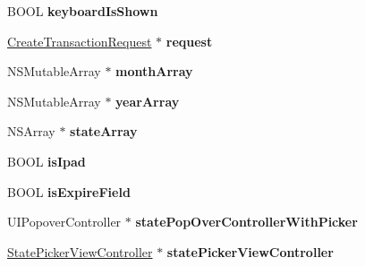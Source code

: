 \begin{DoxyCompactItemize}
\item 
\hypertarget{interface_purchase_view_controller_a2dc9c946b8b61a83de6a713363dc5a04}{
BOOL {\bfseries keyboardIsShown}}
\label{interface_purchase_view_controller_a2dc9c946b8b61a83de6a713363dc5a04}

\item 
\hypertarget{interface_purchase_view_controller_ade1e4f284142cd5479f7287fe9490ce2}{
\hyperlink{interface_create_transaction_request}{CreateTransactionRequest} $\ast$ {\bfseries request}}
\label{interface_purchase_view_controller_ade1e4f284142cd5479f7287fe9490ce2}

\item 
\hypertarget{interface_purchase_view_controller_a217ed433ae0f289fc0e23d0377adeed8}{
NSMutableArray $\ast$ {\bfseries monthArray}}
\label{interface_purchase_view_controller_a217ed433ae0f289fc0e23d0377adeed8}

\item 
\hypertarget{interface_purchase_view_controller_ad157692a23da7629b0138bbab91da48f}{
NSMutableArray $\ast$ {\bfseries yearArray}}
\label{interface_purchase_view_controller_ad157692a23da7629b0138bbab91da48f}

\item 
\hypertarget{interface_purchase_view_controller_aac16ded937a312a341d188b7fa31a20d}{
NSArray $\ast$ {\bfseries stateArray}}
\label{interface_purchase_view_controller_aac16ded937a312a341d188b7fa31a20d}

\item 
\hypertarget{interface_purchase_view_controller_aa199ffac94e28801e5f2b36b0317307c}{
BOOL {\bfseries isIpad}}
\label{interface_purchase_view_controller_aa199ffac94e28801e5f2b36b0317307c}

\item 
\hypertarget{interface_purchase_view_controller_a85a89c7744c71663e42ac299e8df538c}{
BOOL {\bfseries isExpireField}}
\label{interface_purchase_view_controller_a85a89c7744c71663e42ac299e8df538c}

\item 
\hypertarget{interface_purchase_view_controller_ab3874ebb3234ba7839e9eea2dde00486}{
UIPopoverController $\ast$ {\bfseries statePopOverControllerWithPicker}}
\label{interface_purchase_view_controller_ab3874ebb3234ba7839e9eea2dde00486}

\item 
\hypertarget{interface_purchase_view_controller_a68a5283c84743fb6faac25a09288df7c}{
\hyperlink{interface_state_picker_view_controller}{StatePickerViewController} $\ast$ {\bfseries statePickerViewController}}
\label{interface_purchase_view_controller_a68a5283c84743fb6faac25a09288df7c}


\end{DoxyCompactItemize}
